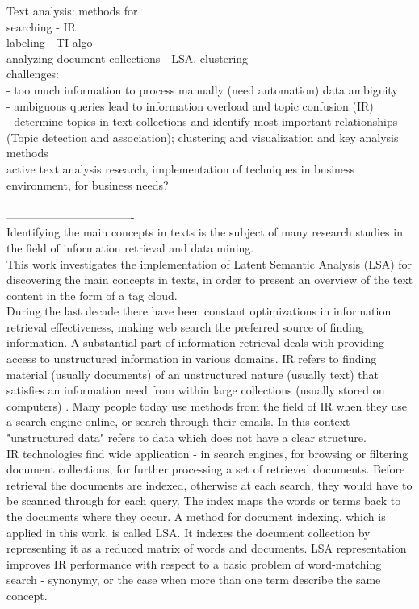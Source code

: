\begin{center}
Text analysis: methods for \\
searching - IR\\
labeling - TI algo\\
analyzing document collections - LSA, clustering\\

challenges:\\
- too much information to process manually (need automation)
data ambiguity\\

- ambiguous queries lead to information overload and topic confusion (IR)\\
- determine topics in text collections and identify most important relationships (Topic detection and association); clustering and visualization and key analysis methods\\

active text analysis research, implementation of techniques in business environment, for business needs? \\


----------------------------------\\
----------------------------------\\
Identifying the main concepts in texts is the subject of many research studies in the field of information retrieval and data mining. \\

This work investigates the implementation of Latent Semantic Analysis (LSA) for discovering the main concepts in texts, in order to present an overview of the text content in the form of a tag cloud.\\


During the last decade there have been constant optimizations in information retrieval effectiveness, making web search the preferred source of finding information. A substantial part of information retrieval deals with providing access to unstructured information in various domains. \gls{IR} refers to finding material (usually documents) of an unstructured nature (usually text) that satisfies an information need from within large collections (usually stored on computers) \cite{Mann08}. Many people today use methods from the field of IR when they use a search engine online, or search through their emails. In this context "unstructured data" refers to data which does not have a clear structure.\\

\gls{IR} technologies find wide application - in search engines, for browsing or filtering document collections, for further processing a set of retrieved documents. Before retrieval the documents are indexed, otherwise at each search, they would have to be scanned through for each query. The index maps the words or terms back to the documents where they occur. A method for document indexing, which is applied in this work, is called \gls{LSA}. It indexes the document collection by representing it as a reduced matrix of words and documents. \gls{LSA} representation improves \gls{IR} performance with respect to a basic problem of word-matching search - synonymy, or the case when more than one term describe the same concept. \\


\end{center}

